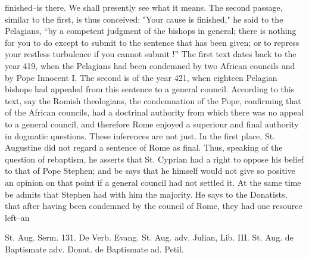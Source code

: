 finished--is there. We shall presently see what it means. The second passage, similar to the first, is thus conceived: "Your cause is finished," he said to the Pelagians, “by a competent judgment of the bishops in general; there is nothing for you to do except to submit to the sentence that has been given; or to repress your restless turbulence if you cannot submit !” The first text dates back to the year 419, when the Pelagians had been condemned by two African councils and by Pope Innocent I. The second is of the year 421, when eighteen Pelagian bishops had appealed from this sentence to a general council. According to this text, say the Romish theologians, the condemnation of the Pope, confirming that of the African councils, had a doctrinal authority from which there was no appeal to a general council, and therefore Rome enjoyed a superiour and final authority in dogmatic questions. These inferences are not just. In the first place, St. Augustine did not regard a sentence of Rome as final. Thus, speaking of the question of rebaptism, he asserts that St. Cyprian had a right to oppose his belief to that of Pope Stephen; and be says that he himself would not give so positive an opinion on that point if a general council had not settled it. At the same time be admits that Stephen had with him the majority. He says to the Donatists, that after having been condemned by the council of Rome, they had one resource left--an

St. Aug. Serm. 131. De Verb. Evang. St. Aug. adv. Julian, Lib. III. St. Aug. de Baptismate adv. Donat. de Baptismate ad. Petil.

